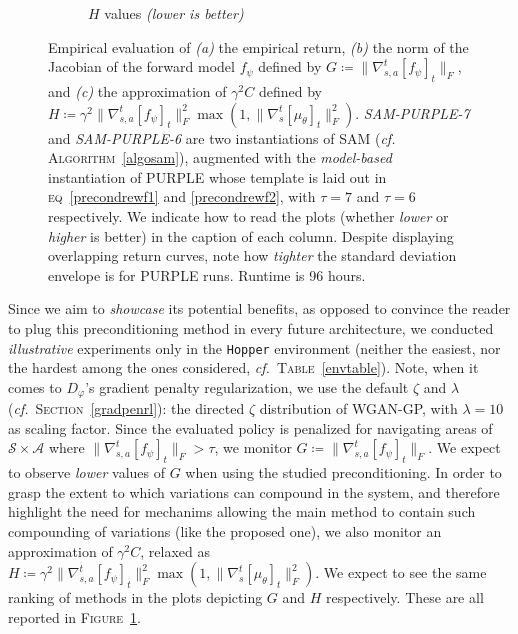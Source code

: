 \begin{figure}
\begin{subfigure}[t]{0.33\textwidth}
    \caption{$H$ values \textit{(lower is better)}}
  \end{subfigure}
  \caption{Empirical evaluation of
  \textit{(a)} the empirical return,
  \textit{(b)} the norm of the Jacobian of the forward model $f_\psi$ defined by
  $G \coloneqq \lVert\nabla_{s,a}^t[f_\psi]_t\rVert _F$, and
  \textit{(c)} the approximation of $\gamma^2 C$ defined by
  $H \coloneqq \gamma^2 \lVert\nabla_{s,a}^t[f_\psi]_t\rVert _F^2 \max (1, \lVert\nabla_s^t[\mu_\theta]_t\rVert _F^2)$.
  \textit{SAM-PURPLE-7} and \textit{SAM-PURPLE-6} are two instantiations of SAM
  (\textit{cf.} \textsc{Algorithm}~\ref{algosam}),
  augmented with
  the \emph{model-based} instantiation of PURPLE
  whose template is laid out in
  \textsc{eq}~\ref{precondrewf1} and \ref{precondrewf2},
  with $\tau=7$ and $\tau=6$ respectively.
  We indicate how to read the plots (whether \textit{lower} or \textit{higher} is better) in the caption of
  each column.
  Despite displaying overlapping return curves, note how \emph{tighter} the standard deviation envelope is
  for PURPLE runs.
  Runtime is 96 hours.}
  \label{purplepsi}
\end{figure}

Since we aim to \textit{showcase} its potential benefits, as opposed to convince the reader to plug this
preconditioning method in every future architecture, we conducted \textit{illustrative} experiments
only in the \texttt{Hopper} environment (neither the easiest, nor the hardest among the ones
considered, \textit{cf.}~\textsc{Table}~\ref{envtable}).
Note, when it comes to $D_\varphi$'s gradient penalty regularization,
we use the default $\zeta$ and $\lambda$ (\textit{cf.}~\textsc{Section}~\ref{gradpenrl}):
the directed $\zeta$ distribution of WGAN-GP, with $\lambda=10$ as scaling factor.
Since the evaluated policy is penalized for navigating areas of $\mathcal{S} \times \mathcal{A}$ where
$\lVert\nabla_{s,a}^t[f_\psi]_t\rVert _F > \tau$, we monitor
$G \coloneqq \lVert\nabla_{s,a}^t[f_\psi]_t\rVert _F$.
We expect to observe \emph{lower} values of $G$ when using the studied preconditioning.
In order to grasp the extent to which variations can compound in the system,
and therefore highlight the need for mechanims allowing the main method to contain such compounding of variations
(like the proposed one),
we also monitor an approximation of $\gamma^2 C$, relaxed as
$H \coloneqq \gamma^2 \lVert\nabla_{s,a}^t[f_\psi]_t\rVert _F^2 \max (1, \lVert\nabla_s^t[\mu_\theta]_t\rVert _F^2)$.
We expect to see the same ranking of methods in the plots depicting $G$ and $H$ respectively.
These are all reported in \textsc{Figure}~\ref{purplepsi}.

